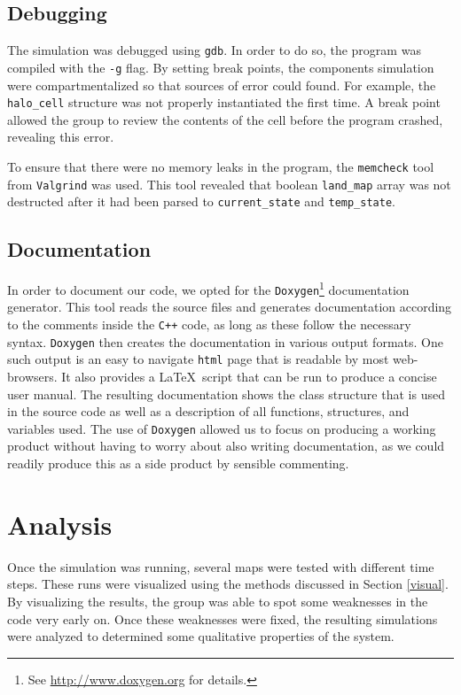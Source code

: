 \documentclass[a4paper,11pt]{article}
\begin{document}
\subsection{Debugging}

The simulation was debugged using \texttt{gdb}.  In order to do so, the program was compiled with the \texttt{-g} flag.  By setting break points, the components simulation were compartmentalized so that sources of error could found.  For example, the \texttt{halo\_cell} structure was not properly instantiated the first time.  A break point allowed the group to review the contents of the cell before the program crashed, revealing this error.   

To ensure that there were no memory leaks in the program, the \texttt{memcheck} tool from \texttt{Valgrind} was used.  This tool revealed that boolean \texttt{land\_map} array was not destructed after it had been parsed to \texttt{current\_state} and \texttt{temp\_state}.  
 
 \subsection{Documentation}

In order to document our code, we opted for the \texttt{Doxygen}\footnote{See \url{http://www.doxygen.org} for details.} documentation generator. This tool reads the source files and generates documentation according to the comments inside the \texttt{C++} code, as long as these follow the necessary syntax. \texttt{Doxygen} then creates the documentation in various output formats. One such output is an easy to navigate \texttt{html} page that is readable by most web-browsers. It also provides a \LaTeX \ script that can be run to produce a concise user manual. The resulting documentation shows the class structure that is used in the source code as well as a description of all functions, structures, and variables used. The use of \texttt{Doxygen} allowed us to focus on producing a working product without having to worry about also writing documentation, as we could readily produce this as a side product by sensible commenting.   
 
 \section{Analysis}
 
 
Once the simulation was running, several maps were tested with different time steps.  These runs were visualized using the methods discussed in Section \ref{visual}.  By visualizing the results, the group was able to spot some weaknesses in the code very early on.  Once these weaknesses were fixed, the resulting simulations were analyzed to determined some qualitative properties of the system.
\end{document}

